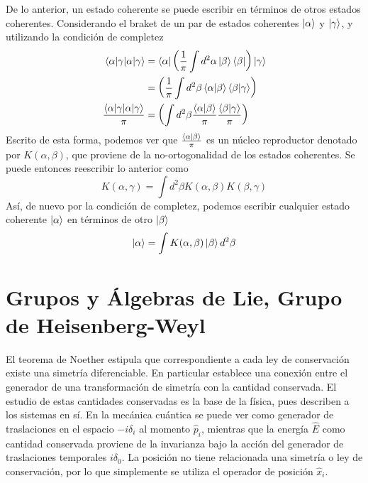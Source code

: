 De lo anterior, un estado coherente se puede escribir en términos de otros estados coherentes. Considerando el braket de un par de estados coherentes $\ket{\alpha}$ y $\ket{\gamma}$, y utilizando la condición de completez
\begin{align*}
  \braket{\alpha|\gamma}             & =  \bra{{\alpha}}\left(\frac{1}{\pi}\int d^2 \alpha \ket{\beta}\bra{\beta} \right) \ket{\gamma}      \\
                                     & = \left(\frac{1}{\pi}\int d^2 \beta \braket{\alpha}{\beta}\braket{\beta}{\gamma} \right)             \\
  \frac{\braket{\alpha|\gamma}}{\pi} & = \left(\int d^2 \beta \frac{\braket{\alpha}{\beta}}{\pi} \frac{\braket{\beta}{\gamma}}{\pi} \right)
\end{align*}
Escrito de esta forma, podemos ver que $\frac{\braket{\alpha}{\beta}}{\pi}$ es un núcleo reproductor denotado por $K(\alpha, \beta)$, que proviene de la no-ortogonalidad de los estados coherentes. Se puede entonces reescribir lo anterior como
\begin{equation*}
  K(\alpha, \gamma) = \int d^2 \beta K(\alpha, \beta) K(\beta, \gamma)
\end{equation*}
Así, de nuevo por la condición de completez, podemos escribir cualquier estado coherente $\ket{\alpha}$ en términos de otro $\ket{\beta}$
\begin{equation*}
  \ket{\alpha} = \int K(\alpha, \beta) \ket{\beta} d^2\beta
\end{equation*}
\section{Grupos y Álgebras de Lie, Grupo de Heisenberg-Weyl}

El teorema de Noether estipula que correspondiente a cada ley de conservación existe una simetría diferenciable. En particular establece una conexión entre el generador de una transformación de simetría con la cantidad conservada. El estudio de estas cantidades conservadas es la base de la física, pues describen a los sistemas en sí. En la mecánica cuántica se puede ver como generador de traslaciones en el espacio $-i\delta_i$ al momento $\hat{p}_i$, mientras que la energía $\hat{E}$ como cantidad conservada proviene de la invarianza bajo la acción del generador de traslaciones temporales $i\delta_0$. La posición no tiene relacionada una simetría o ley de conservación, por lo que simplemente se utiliza el operador de posición $\hat{x}_i$. \cite{Schwichtenberg}

